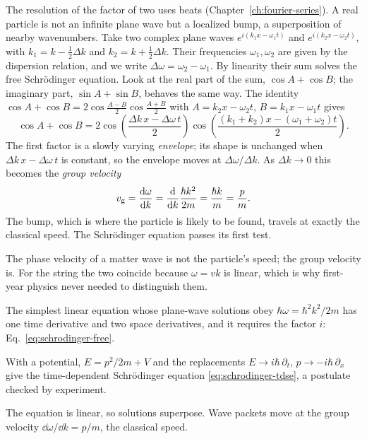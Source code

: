 The resolution of the factor of two uses beats (Chapter~\ref{ch:fourier-series}). A real particle is not an infinite plane wave but a localized bump, a superposition of nearby wavenumbers. Take two complex plane waves $e^{i(k_1x-\omega_1t)}$ and $e^{i(k_2x-\omega_2t)}$, with $k_1=k-\tfrac12\Delta k$ and $k_2=k+\tfrac12\Delta k$. Their frequencies $\omega_1,\omega_2$ are given by the dispersion relation, and we write $\Delta\omega=\omega_2-\omega_1$. By linearity their sum solves the free Schr\"odinger equation. Look at the real part of the sum, $\cos A+\cos B$; the imaginary part, $\sin A+\sin B$, behaves the same way. The identity $\cos A+\cos B=2\cos\frac{A-B}{2}\cos\frac{A+B}{2}$ with $A=k_2x-\omega_2t$, $B=k_1x-\omega_1t$ gives
\[
\cos A+\cos B=2\cos\!\left(\frac{\Delta k\,x-\Delta\omega\,t}{2}\right)\cos\!\left(\frac{(k_1+k_2)x-(\omega_1+\omega_2)t}{2}\right).
\]
The first factor is a slowly varying \emph{envelope}; its shape is unchanged when $\Delta k\,x-\Delta\omega\,t$ is constant, so the envelope moves at $\Delta\omega/\Delta k$. As $\Delta k\to0$ this becomes the \emph{group velocity}
\begin{equation}
v_{\rm g}=\frac{\mathrm{d}\omega}{\mathrm{d} k}=\frac{\mathrm{d}}{\mathrm{d} k}\frac{\hbar k^2}{2m}=\frac{\hbar k}{m}=\frac{p}{m}.
\label{eq:schrodinger-group}
\end{equation}
The bump, which is where the particle is likely to be found, travels at exactly the classical speed. The Schr\"odinger equation passes its first test.

\begin{pitfall}
The phase velocity of a matter wave is not the particle's speed; the group velocity is. For the string the two coincide because $\omega=vk$ is linear, which is why first-year physics never needed to distinguish them.
\end{pitfall}

\begin{keyideas}
\item The simplest linear equation whose plane-wave solutions obey $\hbar\omega=\hbar^2k^2/2m$ has one time derivative and two space derivatives, and it requires the factor $i$: Eq.~\eqref{eq:schrodinger-free}.
\item With a potential, $E=p^2/2m+V$ and the replacements $E\to i\hbar\,\partial_t$, $p\to-i\hbar\,\partial_x$ give the time-dependent Schr\"odinger equation \eqref{eq:schrodinger-tdse}, a postulate checked by experiment.
\item The equation is linear, so solutions superpose. Wave packets move at the group velocity $\dd\omega/\dd k=p/m$, the classical speed.
\end{keyideas}


